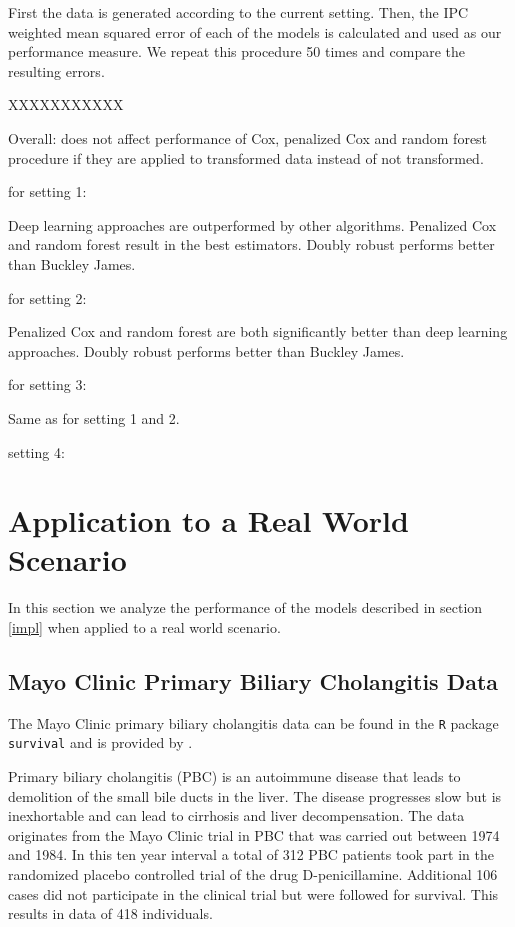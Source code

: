 \documentclass[12pt, a4paper]{scrartcl}
\theoremstyle{definition}
\theoremstyle{plain}
\numberwithin{equation}{section}
\numberwithin{figure}{section}
\numberwithin{table}{section}
\begin{document}
	First the data is generated according to the current setting.
	Then, the IPC weighted mean squared error of each of the models is calculated and used as our performance measure.
	We repeat this procedure 50 times and compare the resulting errors.
	
	XXXXXXXXXXX
	
	Overall: does not affect performance of Cox, penalized Cox and random forest procedure if they are applied to transformed data instead of not transformed.
	
	for setting 1:
	
	Deep learning approaches are outperformed by other algorithms.
	Penalized Cox and random forest result in the best estimators.
	Doubly robust performs better than Buckley James.
	
	for setting 2:
	
	Penalized Cox and random forest are both significantly better than deep learning approaches.
	Doubly robust performs better than Buckley James.
	
	for setting 3:
	
	Same as for setting 1 and 2.
	
	setting 4:
	
	
	\newpage
	\section{Application to a Real World Scenario}
	In this section we analyze the performance of the models described in section \ref{impl} when applied to a real world scenario.
	
	\subsection{Mayo Clinic Primary Biliary Cholangitis Data}
	The Mayo Clinic primary biliary cholangitis data can be found in the \texttt{R} package \texttt{survival} and is provided by \citet*{survival-book}.
	
	Primary biliary cholangitis (PBC) is an autoimmune disease that leads to demolition of the small bile ducts in the liver.
	The disease progresses slow but is inexhortable and can lead to cirrhosis and liver decompensation.
	The data originates from the Mayo Clinic trial in PBC that was carried out between 1974 and 1984.
	In this ten year interval a total of 312 PBC patients took part in the randomized placebo controlled trial of the drug D-penicillamine.
	Additional 106 cases did not participate in the clinical trial but were followed for survival.
	This results in data of 418 individuals.
	
\end{document}
